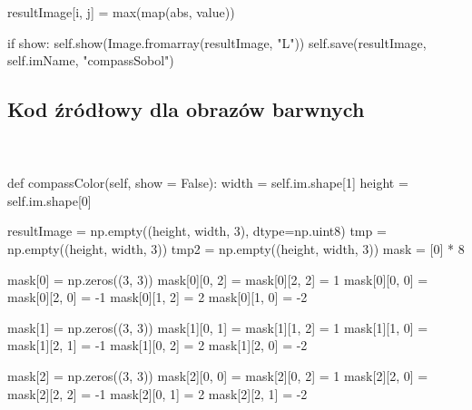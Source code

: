 \documentclass[final,a4paper,openany,12pt]{mwbk}
\begin{document}
\indent \indent \indent resultImage[i, j] = max(map(abs, value)) \newline

\indent \indent \indent if show: \newline
\indent \indent \indent self.show(Image.fromarray(resultImage, "L")) \newline
\indent \indent \indent self.save(resultImage, self.imName, "compassSobol") \newline

\newpage
\subsection*{Kod źródłowy dla obrazów barwnych}
\hfill
\\\\
\noindent def compassColor(self, show = False): \newline
\indent width = self.im.shape[1] \newline
\indent height = self.im.shape[0] \newline

resultImage = np.empty((height, width, 3), dtype=np.uint8) \newline
\indent tmp = np.empty((height, width, 3)) \newline
\indent tmp2 = np.empty((height, width, 3)) \newline
\indent mask = [0] * 8 \newline

mask[0] = np.zeros((3, 3)) \newline
\indent mask[0][0, 2] = mask[0][2, 2] = 1 \newline
\indent mask[0][0, 0] = mask[0][2, 0] = -1 \newline
\indent mask[0][1, 2] = 2 \newline
\indent mask[0][1, 0] = -2 \newline

mask[1] = np.zeros((3, 3)) \newline
\indent mask[1][0, 1] = mask[1][1, 2] = 1 \newline
\indent mask[1][1, 0] = mask[1][2, 1] = -1 \newline
\indent mask[1][0, 2] = 2 \newline
\indent mask[1][2, 0] = -2 \newline

mask[2] = np.zeros((3, 3)) \newline
\indent mask[2][0, 0] = mask[2][0, 2] = 1 \newline
\indent mask[2][2, 0] = mask[2][2, 2] = -1 \newline
\indent mask[2][0, 1] = 2 \newline
\indent mask[2][2, 1] = -2 \newline
\end{document}
